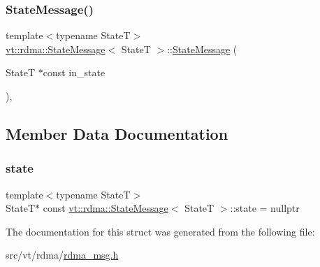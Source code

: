 \subsubsection{\texorpdfstring{State\+Message()}{StateMessage()}}
{\footnotesize\ttfamily template$<$typename StateT$>$ \\
\hyperlink{structvt_1_1rdma_1_1_state_message}{vt\+::rdma\+::\+State\+Message}$<$ StateT $>$\+::\hyperlink{structvt_1_1rdma_1_1_state_message}{State\+Message} (\begin{DoxyParamCaption}\item[{StateT $\ast$const}]{in\+\_\+state }\end{DoxyParamCaption})\hspace{0.3cm}{\ttfamily [inline]}, {\ttfamily [explicit]}}



\subsection{Member Data Documentation}
\mbox{\label{structvt_1_1rdma_1_1_state_message_a9a80ddef962eae297172e1f269a59b7f}} 
\subsubsection{\texorpdfstring{state}{state}}
{\footnotesize\ttfamily template$<$typename StateT$>$ \\
StateT$\ast$ const \hyperlink{structvt_1_1rdma_1_1_state_message}{vt\+::rdma\+::\+State\+Message}$<$ StateT $>$\+::state = nullptr}



The documentation for this struct was generated from the following file\+:\begin{DoxyCompactItemize}
\item 
src/vt/rdma/\hyperlink{rdma__msg_8h}{rdma\+\_\+msg.\+h}\end{DoxyCompactItemize}

